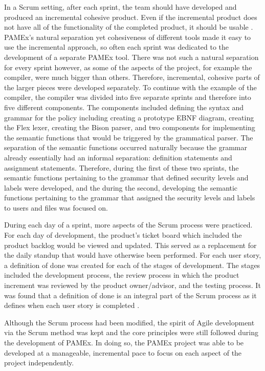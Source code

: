 In a Scrum setting, after each sprint, the team should have developed 
and produced an incremental cohesive product. Even if the incremental 
product does not have all of the functionality of the completed product, it should be usable \cite{scrumorg}. 
PAMEx's natural separation yet cohesiveness of different tools made 
it easy to use the incremental approach, so often each sprint was dedicated to the development of a separate PAMEx tool. 
There was not such a natural separation for every sprint however, 
as some of the aspects of the project, for example the compiler, were 
much bigger than others. Therefore, incremental, 
cohesive parts of the larger pieces were developed separately. 
To continue with the example of the compiler, the compiler was divided into five separate sprints and therefore 
into five different components. The components included 
defining the syntax and grammar for the policy including creating a 
prototype EBNF diagram, creating the Flex lexer, creating the Bison 
parser, and two components for implementing the semantic functions that 
would be triggered by the grammatical parser. The separation of the semantic functions occurred 
naturally because the grammar already essentially had an informal 
separation: definition statements and assignment statements. Therefore, 
during the first of these two sprints, the 
semantic functions pertaining to the grammar that defined security 
levels and labels were developed, and the during the second, 
developing the semantic functions pertaining to the grammar that 
assigned the security levels and labels to users and files was focused on. 

During each day of a sprint, more aspects of the Scrum 
process were practiced. For each day of development, the product’s ticket board which 
included the product backlog would be viewed and updated. 
This served as a replacement for the daily standup that would have 
otherwise been performed. For each user story, a 
definition of done was created for each of the stages of development. The stages 
included the development process, the review process in which the 
product increment was reviewed by the product owner/advisor, and the 
testing process. It was found that a definition of done is an 
integral part of the Scrum process as it defines when each user story 
is completed \cite{lacey2015}\cite{scrumorg}. 

Although the Scrum process 
had been modified, the spirit of Agile development via the Scrum method was kept and 
the core principles were still followed during the development of PAMEx. In doing so, the PAMEx project was 
able to be developed at a manageable, incremental pace to focus on each aspect of the project independently. 
\vspace{\baselineskip}

